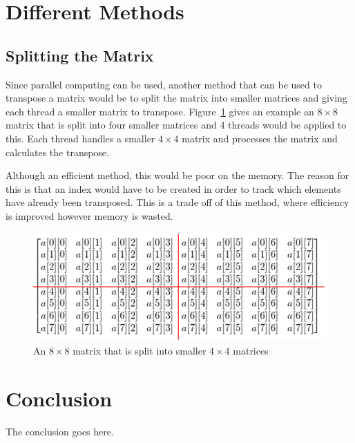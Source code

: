\documentclass[10pt, conference]{IEEEtran}
\begin{document}
\section{Different Methods}
\label{Different Methods}

\subsection{Splitting the Matrix}
\label{Splitting the Matrix}
Since parallel computing can be used, another method that can be used to transpose a matrix would be to split the matrix into smaller matrices and giving each thread a smaller matrix to transpose. Figure~\ref{Splitting} gives an example an $8\times8$ matrix that is split into four smaller matrices and 4 threads would be applied to this. Each thread handles a smaller $4\times4$ matrix and processes the matrix and calculates the transpose.

Although an efficient method, this would be poor on the memory. The reason for this is that an index would have to be created in order to track which elements have already been transposed. This is a trade off of this method, where efficiency is improved however memory is wasted.

\begin{figure}[h!]
\renewcommand{\thefigure}{\arabic{figure}}
\centering
\includegraphics[scale=0.35]{Splitting.png}
\caption{An $8\times8$ matrix that is split into smaller $4\times4$ matrices}
\label{Splitting}
\end{figure}

\section{Conclusion}
\label{Conclusion}
The conclusion goes here.
\end{document}
